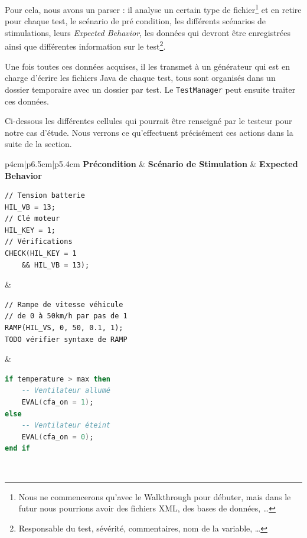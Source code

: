 Pour cela, nous avons un parser : il analyse un certain type de fichier\footnote{Nous ne commencerons qu'avec le Walkthrough pour débuter, mais dans le futur nous pourrions avoir des fichiers XML, des bases de données, \ldots} et en retire pour chaque test, le scénario de pré condition, les différents scénarios de stimulations, leurs \textit{Expected Behavior}, les données qui devront être enregistrées ainsi que différentes information sur le test\footnote{Responsable du test, sévérité, commentaires, nom de la variable, \ldots}.

Une fois toutes ces données acquises, il les transmet à un générateur qui est en charge d'écrire les fichiers Java de chaque test, tous sont organisés dans un dossier temporaire avec un dossier par test. Le \texttt{TestManager} peut ensuite traiter ces données.

\begin{exemple}
Ci-dessous les différentes cellules qui pourrait être renseigné par le testeur pour notre cas d'étude. Nous verrons ce qu'effectuent précisément ces actions dans la suite de la section.	

\begin{tabular}{p{4cm}|p{6.5cm}|p{5.4cm}}
	\textbf{Précondition} & \textbf{Scénario de Stimulation} & \textbf{Expected Behavior}\\
	\hline
	\begin{minipage}{0.1\linewidth}
		\begin{lstlisting}[framerule=0pt]
// Tension batterie
HIL_VB = 13;
// Clé moteur
HIL_KEY = 1;
// Vérifications
CHECK(HIL_KEY = 1 
	&& HIL_VB = 13);
	\end{lstlisting}
	\end{minipage} & 
	\begin{minipage}{0.1\linewidth}
		\begin{lstlisting}[framerule=0pt]
// Rampe de vitesse véhicule
// de 0 à 50km/h par pas de 1		
RAMP(HIL_VS, 0, 50, 0.1, 1);
TODO vérifier syntaxe de RAMP		
		\end{lstlisting}
	\end{minipage} 
	&
		\begin{minipage}{0.1\linewidth}
			\begin{lstlisting}[language=ada,framerule=0pt]	
if temperature > max then
	-- Ventilateur allumé
	EVAL(cfa_on = 1); 
else
	-- Ventilateur éteint
	EVAL(cfa_on = 0); 
end if
			\end{lstlisting}
		\end{minipage} 
	\\
\end{tabular}
\end{exemple}

